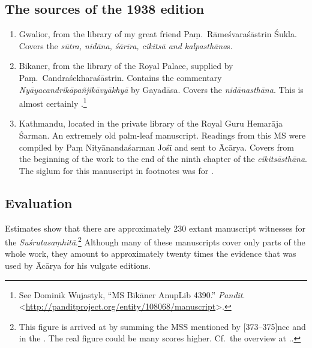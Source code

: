 %
\subsection{The sources of the 1938 edition}
\begin{enumerate}
    \item [1]  Gwalior, from the library of my great friend Paṃ.\ Rāmeśvaraśāstrin 
    Śukla. 
    Covers the \emph{sūtra, nidāna, śārīra, cikitsā and kalpasthāna}s.
    
    \item[2] Bikaner, from the library of the Royal Palace, supplied by Paṃ.\ 
    Candraśekharaśāstrin. Contains the commentary 
    \emph{Nyāyacandrikāpañjikāvyākhyā} by Gayadāsa.  Covers the 
    \emph{nidānasthāna}.      
    This is almost certainly .\footnote{See Dominik Wujastyk, “MS Bīkāner AnupLib 4390.” 
    \emph{Pandit}. 
    <\url{http://panditproject.org/entity/108068/manuscript}>.}
    
    \item [3] Kathmandu, located in the private library of the Royal Guru Hemarāja 
    Śarman.  An extremely old palm-leaf manuscript. Readings from this MS were 
    compiled by Paṃ Nityānandaśarman Jośī and sent to Ācārya. Covers from the 
    beginning of the work to the end of the ninth chapter of the 
    \emph{cikitsāsthāna}.  The 
    siglum for this manuscript in footnotes was  for 
    . 
\end{enumerate}
\subsection{Evaluation}

Estimates show that there are approximately 230 extant manuscript witnesses for
the \emph{Suśrutasaṃhitā}.\footnote{This figure is arrived at by summing the MSS
    mentioned by \tvolcite{39}[373--375]{ncc} and in the \cite{ngmcp}. The real figure
    could be many scores higher.  Cf.\ the overview at
    \cite{wuja-2020}.\label{SSmss}.}  Although many of these manuscripts cover only
    parts of the whole work, they amount to approximately twenty times the evidence
    that was used by Ācārya for his vulgate editions.

